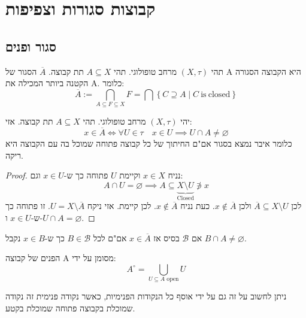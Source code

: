 \documentclass{tstextbook}
\begin{document}
\chapter{קבוצות סגורות וצפיפות}

\section{סגור ופנים}

\begin{definition}
תהי \((X,\tau)\) מרחב טופולוגי. תהי \(A\subseteq X\) תת קבוצה. \(\overline{A}\) הסגור של A היא הקבוצה הסגורה הקטנה ביותר המכילה את A. כלומר:
$$\overline{A} := \bigcap_{A\subseteq F\subseteq X} F=\bigcap\left\{ C\supseteq A\mid C{\mathrm{~is~closed}} \right\}$$

\end{definition}
\begin{proposition}
יהי \((X,\tau)\) מרחב טופולוגי. תהי \(A\subseteq X\) תת קבוצה. אזי:
$$x\in \overline{A} \iff \forall U \in \tau \quad x \in U \implies U\cap  A\neq \varnothing $$
כלומר איבר נמצא בסגור אם"ם החיתוך של כל קבוצה פתוחה שמוכל בה עם הקבוצה היא ריקה.

\end{proposition}
\begin{proof}
נניח \(x \in X\) וקיימת \(U\) פתוחה כך ש-\(x \in U\) וגם:
$$A\cap  U = \varnothing \implies A\subseteq \underbrace{ X \setminus  U }_{ \text{Closed} } \not\ni x$$
לכן \(\overline{A} \subseteq X \setminus U\) ולכן \(x \not\in \overline{ A}\).
כעת נניח \(x \not\in \overline{A}\). לכן קיימת. אזי ניקח \(U= X \setminus \overline{A}\). זו פתוחה כך ש-\(x \in U\) ו-\(U\cap A = \varnothing\).

\end{proof}
\begin{corollary}
אם \(\mathcal{ B}\) בסיס אז \(x \in \overline{A}\) אם"ם לכל \(B \in \mathcal{B}\) כך ש-\(x \in B\) נקבל \(B\cap A \neq \varnothing\).

\end{corollary}
\begin{definition}
הפנים של קבוצה A מסומן על ידי:
$$A^{\circ }=\bigcup_{U\subseteq A \text{ open}}U$$

\end{definition}
\begin{remark}
ניתן לחשוב על זה גם על ידי אוסף כל הנקודות הפנימיות, כאשר נקודה פנימית זה נקודה שמוכלת בקבוצה פתוחה שמוכלת בקטע.

\end{remark}
\end{document}
